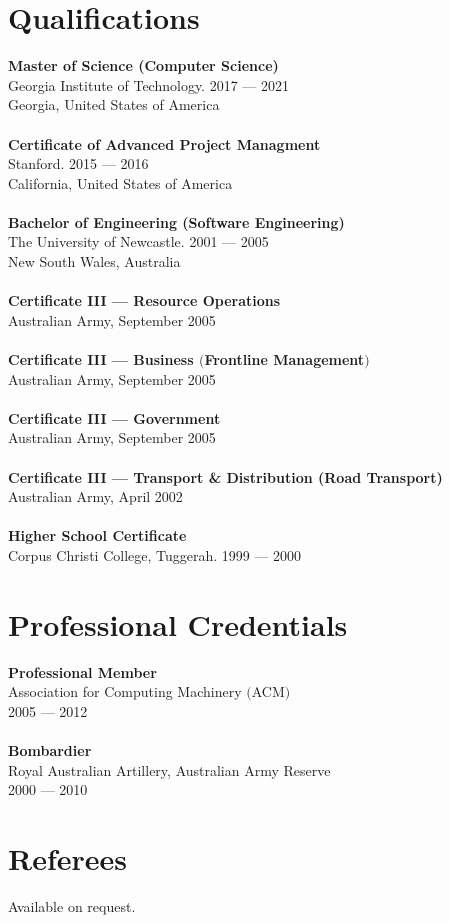 \documentclass[a4paper]{article}
\begin{document}
\section*{Qualifications}
\textbf{Master of Science (Computer Science)}\\
Georgia Institute of Technology. 2017 --- 2021\\Georgia, United States of America\\\\
\textbf{Certificate of Advanced Project Managment}\\
Stanford. 2015 --- 2016\\California, United States of America\\\\
\textbf{Bachelor of Engineering (Software Engineering)}\\
The University of Newcastle. 2001 --- 2005\\New South Wales, Australia\\\\
\textbf{Certificate III --- Resource Operations}\\
Australian Army, September 2005\\\\
\textbf{Certificate III --- Business $($Frontline Management$)$}\\
Australian Army, September 2005\\\\
\textbf{Certificate III --- Government}\\
Australian Army, September 2005\\\\
\textbf{Certificate III --- Transport \& Distribution (Road Transport)}\\
Australian Army, April 2002\\\\
\textbf{Higher School Certificate}\\
Corpus Christi College, Tuggerah. 1999 --- 2000
\vspace{5pt}
\section*{Professional Credentials}
\textbf{Professional Member}\\
Association for Computing Machinery $($ACM$)$\\
2005 --- 2012\\\\
\textbf{Bombardier}\\
Royal Australian Artillery, Australian Army Reserve\\
2000 --- 2010
\section*{Referees}
Available on request.
\end{document}
